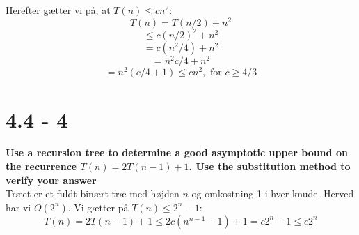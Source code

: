 \documentclass{report}
\begin{document}
\noindent Herefter gætter vi på, at $T(n) \leq cn^2$:
$$T(n) = T(n/2) + n^2$$
$$ \leq c(n/2)^2 + n^2$$
$$ = c(n^2/4) + n^2$$
$$ = n^2 c/4 + n^2$$
$$ = n^2(c/4 + 1) \leq cn^2, \text{ for $c \geq 4/3$}$$

\section*{4.4 - 4}
\textbf{Use a recursion tree to determine a good asymptotic upper bound on the recurrence $T(n) = 2T(n - 1) + 1$. Use the substitution method to verify your answer} \\
Træet er et fuldt binært træ med højden $n$ og omkostning 1 i hver knude. Herved har vi $O(2^n)$. Vi gætter på $T(n) \leq 2^n - 1$: \\
$$T(n) = 2T(n - 1) + 1 \leq 2c(n^{n - 1} - 1) + 1 = c2^n - 1\leq c2^n$$
\end{document}
